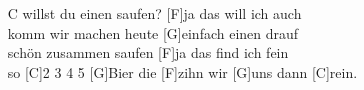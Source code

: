 \begin{guitarMagic}
\begin{enumerate}
        \item [C]willst du einen saufen? [F]ja das will ich auch\\
            [C]komm wir machen heute [G]einfach einen drauf\\
            [C]schön zusammen saufen [F]ja das find ich fein\\
            so [C]2 3 4 5  [G]Bier  die [F]zihn wir [G]uns dann [C]rein.
    \end{enumerate}
\end{guitarMagic}
